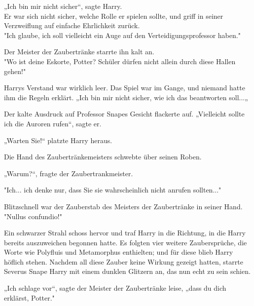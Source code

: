 {„Ich bin mir nicht sicher“, sagte Harry.\\ Er war sich nicht sicher, welche Rolle er spielen sollte, und griff in seiner Verzweiflung auf einfache Ehrlichkeit zurück.\\ "Ich glaube, ich soll vielleicht ein Auge auf den Verteidigungsprofessor haben."

Der Meister der Zaubertränke starrte ihn kalt an.\\ "Wo ist deine Eskorte, Potter? Schüler dürfen nicht allein durch diese Hallen gehen!"

Harrys Verstand war wirklich leer. Das Spiel war im Gange, und niemand hatte ihm die Regeln erklärt. „Ich bin mir nicht sicher, wie ich das beantworten soll...„

Der kalte Ausdruck auf Professor Snapes Gesicht flackerte auf. „Vielleicht sollte ich die Auroren rufen“, sagte er.

„Warten Sie!“ platzte Harry heraus.

Die Hand des Zaubertränkemeisters schwebte über seinen Roben.

„Warum?“, fragte der Zaubertrankmeister.

"Ich... ich denke nur, dass Sie sie wahrscheinlich nicht anrufen sollten..."

Blitzschnell war der Zauberstab des Meisters der Zaubertränke in seiner Hand.\\ "Nullus confundio!"

Ein schwarzer Strahl schoss hervor und traf Harry in die Richtung, in die Harry bereits auszuweichen begonnen hatte. Es folgten vier weitere Zaubersprüche, die Worte wie Polyfluis und Metamorphus enthielten; und für diese blieb Harry höflich stehen. Nachdem all diese Zauber keine Wirkung gezeigt hatten, starrte Severus Snape Harry mit einem dunklen Glitzern an, das nun echt zu sein schien.

„Ich schlage vor“, sagte der Meister der Zaubertränke leise, „dass du dich erklärst, Potter."

}
